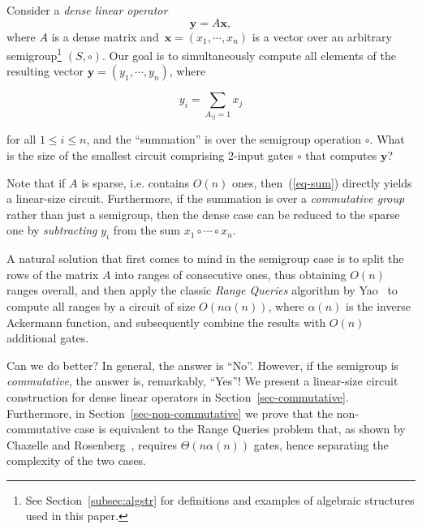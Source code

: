 \documentclass[11pt,letterpaper]{article}
\begin{document}
Consider a \emph{dense linear operator}
\[
\mathbf{y} = A\mathbf{x},
\]
where $A$ is a dense matrix and~$\mathbf{x}=(x_1, \cdots, x_n)$ is a vector over
an arbitrary semigroup\footnote{See Section~\ref{subsec:algstr} for definitions
and examples of algebraic structures used in this paper.} $(S, \circ)$. Our goal
is to simultaneously compute all elements of the resulting vector
$\mathbf{y}=(y_1, \cdots, y_n)$, where

\begin{equation}\label{eq-sum}
y_i = \sum_{A_{ij}=1} x_j
\end{equation}

\noindent
for all $1 \le i \le n$, and the ``summation'' is over the semigroup operation
$\circ$. What is the size of the smallest circuit comprising 2-input gates
$\circ$ that computes $\mathbf{y}$?

Note that if $A$ is sparse, i.e. contains $O(n)$ ones, then~(\ref{eq-sum})
directly yields a linear-size circuit. Furthermore, if the summation is over a
\emph{commutative group} rather than just a semigroup, then the dense case can
be reduced to the sparse one by \emph{subtracting} $y_i$ from the sum
$x_1 \circ \cdots \circ x_n$.

A natural solution that first comes to mind in the semigroup case is to split
the rows of the matrix $A$ into ranges of consecutive ones, thus obtaining
$O(n)$ ranges overall, and then apply the classic \emph{Range Queries} algorithm
by Yao~\cite{DBLP:conf/stoc/Yao82} to compute all ranges by a circuit of size
$O(n\alpha(n))$, where $\alpha(n)$ is the inverse Ackermann function, and
subsequently combine the results with $O(n)$ additional gates.

Can we do better? In general, the answer is ``No''. However, if the semigroup is
\emph{commutative}, the answer is, remarkably, ``Yes''! We present a linear-size
circuit construction for dense linear operators in Section~\ref{sec-commutative}.
Furthermore, in Section~\ref{sec-non-commutative} we prove that the
non-commutative case is equivalent to the Range Queries problem that, as shown
by Chazelle and Rosenberg~\cite{DBLP:journals/ijcga/ChazelleR91}, requires
$\Theta(n\alpha(n))$ gates, hence separating the complexity of the two cases.
\end{document}
